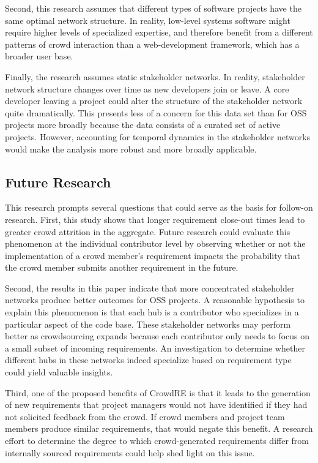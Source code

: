 Second, this research assumes that different types of software projects have the same optimal network structure. In reality, low-level systems software might require higher levels of specialized expertise, and therefore benefit from a different patterns of crowd interaction than a web-development framework, which has a broader user base. 

Finally, the research assumes static stakeholder networks. In reality, stakeholder network structure changes over time as new developers join or leave. A core developer leaving a project could alter the structure of the stakeholder network quite dramatically. This presents less of a concern for this data set than for OSS projects more broadly because the data consists of a curated set of active projects. However, accounting for temporal dynamics in the stakeholder networks would make the analysis more robust and more broadly applicable.

\subsection{Future Research}

This research prompts several questions that could serve as the basis for follow-on research. First, this study shows that longer requirement close-out times lead to greater crowd attrition in the aggregate. Future research could evaluate this phenomenon at the individual contributor level by observing whether or not the implementation of a crowd member's requirement impacts the probability that the crowd member submits another requirement in the future.

Second, the results in this paper indicate that more concentrated stakeholder networks produce better outcomes for OSS projects. A reasonable hypothesis to explain this phenomenon is that each hub is a contributor who specializes in a particular aspect of the code base. These stakeholder networks may perform better as crowdsourcing expands because each contributor only needs to focus on a small subset of incoming requirements. An investigation to determine whether different hubs in these networks indeed specialize based on requirement type could yield valuable insights.

Third, one of the proposed benefits of CrowdRE is that it leads to the generation of new requirements that project managers would not have identified if they had not solicited feedback from the crowd. If crowd members and project team members produce similar requirements, that would negate this benefit. A research effort to determine the degree to which crowd-generated requirements differ from internally sourced requirements could help shed light on this issue.

